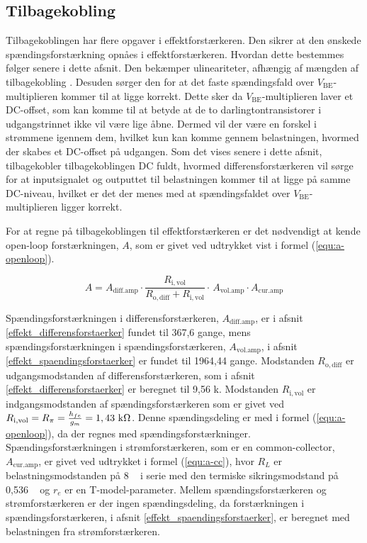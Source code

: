 \subsection{Tilbagekobling}
\label{effekt_tilbagekobling}
Tilbagekoblingen har flere opgaver i effektforstærkeren. Den sikrer at den ønskede spændingsforstærkning opnåes i effektforstærkeren. Hvordan dette bestemmes følger senere i dette afsnit. Den bekæmper ulineariteter, afhængig af mængden af tilbagekobling \cite{tilbage-mm1}%
. Desuden sørger den for at det faste spændingsfald over $V_\mathrm{BE}$-multiplieren kommer til at ligge korrekt. Dette sker da $V_\mathrm{BE}$-multiplieren laver et DC-offset, som kan komme til at betyde at de to darlingtontransistorer i udgangstrinnet ikke vil være lige åbne. Dermed vil der være en forskel i strømmene igennem dem, hvilket kun kan komme gennem belastningen, hvormed der skabes et DC-offset på udgangen. Som det vises senere i dette afsnit, tilbagekobler tilbagekoblingen DC fuldt, hvormed differensforstærkeren vil sørge for at inputsignalet og outputtet til belastningen kommer til at ligge på samme DC-niveau, hvilket er det der menes med at spændingsfaldet over $V_\mathrm{BE}$-multiplieren ligger korrekt. 

For at regne på tilbagekoblingen til effektforstærkeren er det nødvendigt at kende open-loop forstærkningen, $A$, som er givet ved udtrykket vist i formel (\ref{equ:a-openloop}).

\begin{equation}
\label{equ:a-openloop}
A = A_\mathrm{diff.amp} \cdot \frac{R_\mathrm{i,vol}}{R_\mathrm{o,diff} + R_\mathrm{i,vol}} \cdot \frac{}{} A_\mathrm{vol.amp} \cdot A_\mathrm{cur.amp}
\end{equation}

Spændingsforstærkningen i differensforstærkeren, $A_\mathrm{diff.amp}$, er i afsnit \ref{effekt_differensforstaerker} fundet til 367,6 gange, mens spændingsforstærkningen i spændingsforstærkeren, $A_\mathrm{vol.amp}$, i afsnit \ref{effekt_spaendingsforstaerker} er fundet til 1964,44 gange. Modstanden $R_\mathrm{o,diff}$ er udgangsmodstanden af differensforstærkeren, som i afsnit \ref{effekt_differensforstaerker} er beregnet til 9,56 k\ohm. Modstanden $R_\mathrm{i,vol}$ er indgangsmodstanden af spændingsforstærkeren som er givet ved $R_\mathrm{i,vol} = R_\pi = \frac{h_{fe}}{g_m} = 1,43~\mathrm{k}\ohm$. Denne spændingsdeling er med i formel (\ref{equ:a-openloop}), da der regnes med spændingsforstærkninger. Spændingsforstærkningen i strømforstærkeren, som er en common-collector, $A_\mathrm{cur.amp}$, er givet ved udtrykket i formel (\ref{equ:a-cc}), hvor $R_L$ er belastningsmodstanden på 8 \ohm~ i serie med den termiske sikringsmodstand på 0,536 \ohm~ og $r_e$ er en T-model-parameter. Mellem spændingsforstærkeren og strømforstærkeren er der ingen spændingsdeling, da forstærkningen i spændingsforstærkeren, i afsnit \ref{effekt_spaendingsforstaerker}, er beregnet med belastningen fra strømforstærkeren.

